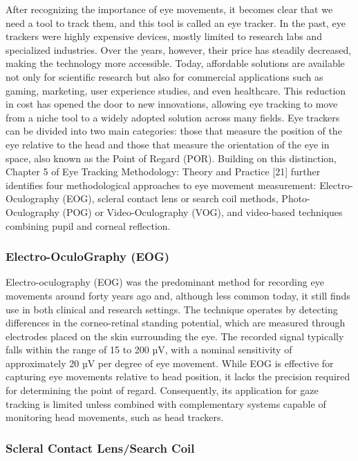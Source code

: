 \documentclass{article}
\begin{document}
After recognizing the importance of eye movements, it becomes clear that we need a tool to track them, and this tool is called an eye tracker.
In the past, eye trackers were highly expensive devices, mostly limited to research labs and specialized industries.
Over the years, however, their price has steadily decreased, making the technology more accessible.
Today, affordable solutions are available not only for scientific research but also for commercial applications such as gaming, marketing, user experience studies, and even healthcare.
This reduction in cost has opened the door to new innovations, allowing eye tracking to move from a niche tool to a widely adopted solution across many fields.
Eye trackers can be divided into two main categories: those that measure the position of the eye relative to the head and those that measure the orientation of the eye in space, also known as the Point of Regard (POR).
Building on this distinction, Chapter 5 of Eye Tracking Methodology: Theory and Practice [21] further identifies four methodological approaches to eye movement measurement: Electro-Oculography (EOG), scleral contact lens or search coil methods, Photo-Oculography (POG) or Video-Oculography (VOG), and video-based techniques combining pupil and corneal reflection.

\subsubsection{Electro-OculoGraphy (EOG)}

Electro-oculography (EOG) was the predominant method for recording eye movements around forty years ago and, although less common today, it still finds use in both clinical and research settings.
The technique operates by detecting differences in the corneo-retinal standing potential, which are measured through electrodes placed on the skin surrounding the eye. The recorded signal typically falls within the range of 15 to 200 µV, with a nominal sensitivity of approximately 20 µV per degree of eye movement. While EOG is effective for capturing eye movements relative to head position, it lacks the precision required for determining the point of regard. Consequently, its application for gaze tracking is limited unless combined with complementary systems capable of monitoring head movements, such as head trackers.

\subsubsection{Scleral Contact Lens/Search Coil}
\end{document}
